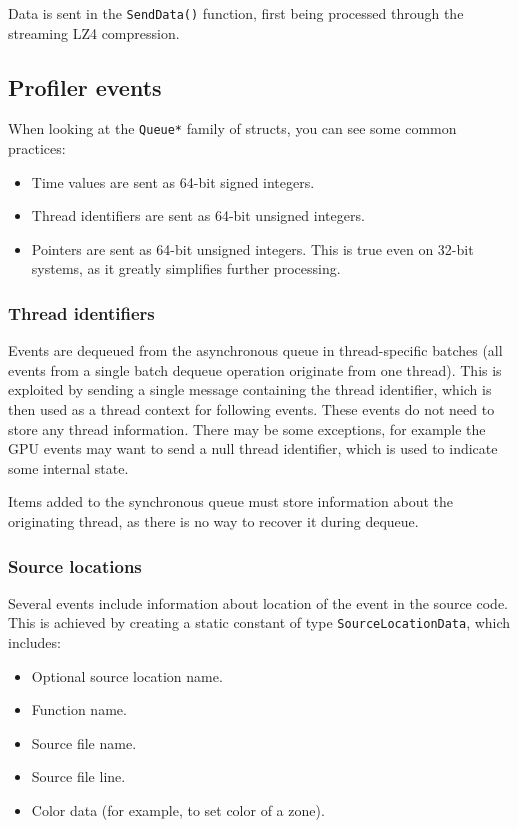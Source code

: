 \documentclass[hidelinks,titlepage,a4paper]{article}
\begin{document}
Data is sent in the \texttt{SendData()} function, first being processed through the streaming LZ4 compression.

\subsection{Profiler events}
\label{profilerevents}

When looking at the \texttt{Queue*} family of structs, you can see some common practices:

\begin{itemize}
\item Time values are sent as 64-bit signed integers.
\item Thread identifiers are sent as 64-bit unsigned integers.
\item Pointers are sent as 64-bit unsigned integers. This is true even on 32-bit systems, as it greatly simplifies further processing.
\end{itemize}

\subsubsection{Thread identifiers}

Events are dequeued from the asynchronous queue in thread-specific batches (all events from a single batch dequeue operation originate from one thread). This is exploited by sending a single message containing the thread identifier, which is then used as a thread context for following events. These events do not need to store any thread information. There may be some exceptions, for example the GPU events may want to send a null thread identifier, which is used to indicate some internal state.

Items added to the synchronous queue must store information about the originating thread, as there is no way to recover it during dequeue.

\subsubsection{Source locations}

Several events include information about location of the event in the source code. This is achieved by creating a static constant of type \texttt{SourceLocationData}, which includes:

\begin{itemize}
\item Optional source location name.
\item Function name.
\item Source file name.
\item Source file line.
\item Color data (for example, to set color of a zone).
\end{itemize}
\end{document}
